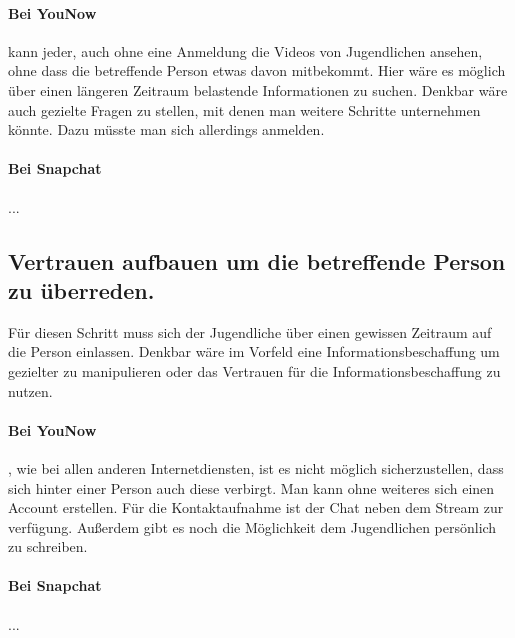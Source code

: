 \paragraph{Bei YouNow}kann jeder, auch ohne eine Anmeldung die Videos von Jugendlichen ansehen, ohne dass die betreffende Person etwas davon mitbekommt. Hier wäre es möglich über einen längeren Zeitraum belastende  Informationen zu suchen. Denkbar wäre auch gezielte Fragen zu stellen, mit denen man weitere Schritte unternehmen könnte. Dazu müsste man sich allerdings anmelden. 

\paragraph{Bei Snapchat} ...

\subsection{Vertrauen aufbauen um die betreffende Person zu überreden.}
Für diesen Schritt muss sich der Jugendliche über einen gewissen Zeitraum auf die Person einlassen. Denkbar wäre im Vorfeld eine Informationsbeschaffung um gezielter zu manipulieren oder das Vertrauen für die Informationsbeschaffung zu nutzen. 

\paragraph{Bei YouNow}, wie bei allen anderen Internetdiensten, ist es nicht möglich sicherzustellen, dass sich hinter einer Person auch diese verbirgt. Man kann ohne weiteres sich einen Account erstellen.  Für die Kontaktaufnahme ist der Chat neben dem Stream zur verfügung. Außerdem gibt es noch die Möglichkeit dem Jugendlichen persönlich zu schreiben. 

\paragraph{Bei Snapchat} ...